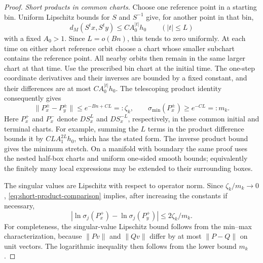 \begin{proof}
\emph{Short products in common charts.}
Choose one reference point in a starting bin.
Uniform Lipschitz bounds for $S$ and $S^{-1}$ give, for another point
in that bin,
\[
 d_M(S^t x,S^t y)\leq C A_0^{|t|}h_0
 \qquad(|t|\leq L)
\]
with a fixed $A_0>1$.
Since $L=o(Bn)$, this tends to zero uniformly.
At each time on either short reference orbit choose a chart whose
smaller subchart contains the reference point.
All nearby orbits then remain in the same larger chart at that time.
Use the prescribed bin chart at the initial time.
The one-step coordinate derivatives and their inverses are bounded by
a fixed constant, and their differences are at most
$C A_0^{|t|}h_0$.
The telescoping product identity consequently gives
\begin{equation}\label{eq:short-product-comparison}
 \|P_x^\pm-P_y^\pm\|\leq e^{-Bn+CL}=:\zeta_k,\qquad
 \sigma_{\min}(P_x^\pm)\geq e^{-CL}=:m_k.
\end{equation}
Here $P_x^+$ and $P_x^-$ denote $DS^L_x$ and $DS^{-L}_x$,
respectively, in these common initial and terminal charts.
For example, summing the $L$ terms in the product difference bounds
it by $C L A_1^{2L}h_0$, which has the stated form.
The inverse product bound gives the minimum stretch.
On a manifold with boundary the same proof uses the nested half-box
charts and uniform one-sided smooth bounds; equivalently the finitely
many local expressions may be extended to their surrounding boxes.

The singular values are Lipschitz with respect to operator norm.
Since $\zeta_k/m_k\to0$, \eqref{eq:short-product-comparison} implies,
after increasing the constants if necessary,
\begin{equation}\label{eq:short-log-singular}
 |\ln\sigma_j(P_x^+)-\ln\sigma_j(P_y^+)|
       \leq 2\zeta_k/m_k .
\end{equation}
For completeness, the singular-value Lipschitz bound follows from
the min--max characterization, because $\|Pv\|$ and $\|Qv\|$
differ by at most $\|P-Q\|$ on unit vectors.
The logarithmic inequality then follows from the lower bound $m_k$.


\end{proof}
